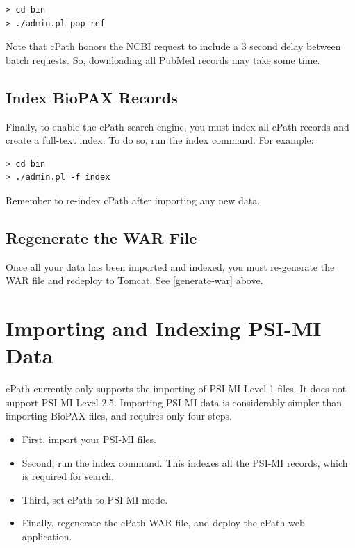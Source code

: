 \documentclass[letterpaper,12pt]{article}
\begin{document}
\begin{verbatim}
> cd bin
> ./admin.pl pop_ref
\end{verbatim}

Note that cPath honors the NCBI request to include a 3 second delay between batch requests.  So, downloading all PubMed records may take some time.

\subsection{Index BioPAX Records}

Finally, to enable the cPath search engine, you must index all cPath records and create a full-text index.  To do so, run the index command.  For example:

\begin{verbatim}
> cd bin
> ./admin.pl -f index
\end{verbatim}

Remember to re-index cPath after importing any new data.

\subsection{Regenerate the WAR File}

Once all your data has been imported and indexed, you must re-generate the WAR file and redeploy to Tomcat.  See \ref{generate-war} above.

\section{Importing and Indexing PSI-MI Data}
\label{import-psi}

cPath currently only supports the importing of PSI-MI Level 1 files.  It does not support PSI-MI Level 2.5.  Importing PSI-MI data is considerably simpler than importing BioPAX files, and requires only four steps.

\begin{itemize}
\item First, import your PSI-MI files.

\item Second, run the index command.  This indexes all the PSI-MI records, which is required for search.

\item Third, set cPath to PSI-MI mode.

\item Finally, regenerate the cPath WAR file, and deploy the cPath web application.

\end{itemize}
\end{document}
